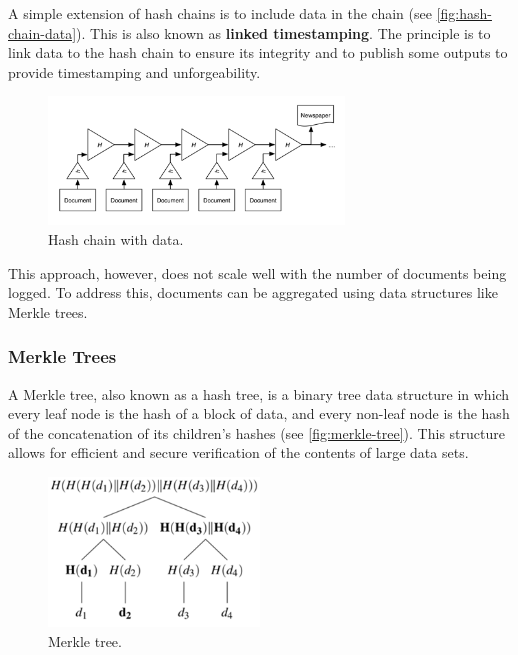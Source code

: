 A simple extension of hash chains is to include data in the chain (see \autoref{fig:hash-chain-data}). This
is also known as \textbf{linked timestamping}. The principle is to link data to
the hash chain to ensure its integrity and to publish some outputs to
provide timestamping and unforgeability.

\begin{figure}[t]
	\begin{center}
		\includegraphics[width=0.7\textwidth]{./figs/hash-chain-with-data.png} 

		\caption{Hash chain with data.}		
		\label{fig:hash-chain-data}

	\end{center}	
\end{figure}

This approach, however, does not scale well with the number of documents
being logged. To address this, documents can be aggregated using data
structures like Merkle trees.

\subsubsection{Merkle Trees}\label{merkle-trees}

A Merkle tree, also known as a hash tree, is a binary tree data
structure in which every leaf node is the hash of a block of data, and
every non-leaf node is the hash of the concatenation of its children's
hashes (see \autoref{fig:merkle-tree}). This structure allows for efficient and secure verification of
the contents of large data sets.

\begin{figure}[t]
	\begin{center}
		\includegraphics[width=0.5\textwidth]{./figs/merkle-tree.png} 

		\caption{Merkle tree.}		
		\label{fig:merkle-tree}

	\end{center}	
\end{figure}

